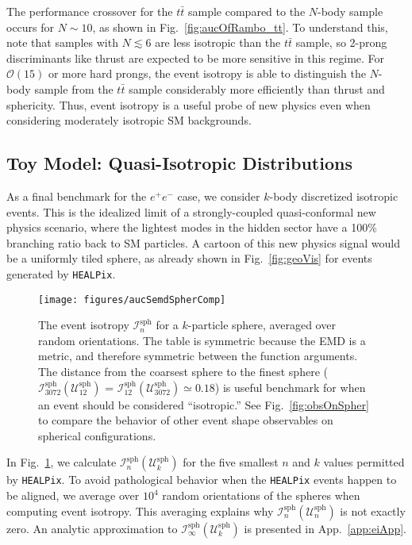 \documentclass[letterpaper,11pt]{article}
\newcommand{\iso}[2]{\mathcal{I}^\text{#1}_{#2}}
\DeclareRobustCommand{\App}[1]{App.~\ref{#1}}
\DeclareRobustCommand{\Fig}[1]{Fig.~\ref{#1}}
\begin{document}
The performance crossover for the $t\bar{t}$ sample compared to the $N$-body sample occurs for $N \sim 10$, as shown in \Fig{fig:aucOfRambo_tt}.
%
To understand this, note that samples with $N\lesssim6$ are less isotropic than the $t\bar{t}$ sample, so 2-prong discriminants like thrust are expected to be more sensitive in this regime. 
%
For $\mathcal{O}(15)$ or more hard prongs, the event isotropy is able to distinguish the $N$-body sample from the $t\bar{t}$ sample considerably more efficiently than thrust and sphericity. 
%
Thus, event isotropy is a useful probe of new physics even when considering moderately isotropic SM backgrounds. 
 



\subsection{Toy Model: Quasi-Isotropic Distributions}
\label{subsec:ee_kbody}

As a final benchmark for the $e^+e^-$ case, we consider $k$-body discretized isotropic events. 
%
This is the idealized limit of a strongly-coupled quasi-conformal new physics scenario, where the lightest modes in the hidden sector have a 100\% branching ratio back to SM particles. 
%
A cartoon of this new physics signal would be a uniformly tiled sphere, as already shown in \Fig{fig:geoVis} for events generated by \texttt{HEALPix}. 

\begin{figure}[t!]
%
\centering
 \texttt{[image: figures/aucSemdSpherComp]}
%
\caption{The event isotropy $\iso{sph}{n}$ for a $k$-particle sphere, averaged over random orientations.
%
The table is symmetric because the EMD is a metric, and therefore symmetric between the function arguments.
%
The distance from the coarsest sphere to the finest sphere ($\iso{sph}{3072}(\mathcal{U}^\text{sph}_{12})$ =  $\iso{sph}{12}(\mathcal{U}^\text{sph}_{3072}) \simeq 0.18$) is useful benchmark for when an event should be considered ``isotropic.''
%
See \Fig{fig:obsOnSpher} to compare the behavior of other event shape observables on spherical configurations.}
\label{fig:eeSphereToSphere}
\end{figure}



In \Fig{fig:eeSphereToSphere}, we calculate $\iso{sph}{n}(\mathcal{U}^\text{sph}_{k})$ for the five smallest $n$ and $k$ values permitted by \texttt{HEALPix}.
%
To avoid pathological behavior when the \texttt{HEALPix} events happen to be aligned, we average over $10^4$ random orientations of the spheres when computing event isotropy.
%
This averaging explains why $\iso{sph}{n}(\mathcal{U}^\text{sph}_{n})$ is not exactly zero.
%
An analytic approximation to $\iso{sph}{\infty}(\mathcal{U}^\text{sph}_{k})$ is presented in \App{app:eiApp}.
\end{document}
